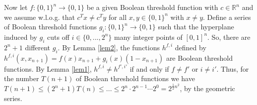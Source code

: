 \documentclass[11pt]{amsart}
\theoremstyle{definition}
\theoremstyle{definition}
\begin{document}
Now let $f \colon \{0,1 \}^n \rightarrow \{0,1 \}$ be a given Boolean threshold function with $c \in \mathbb{R}^n$ and we assume w.l.o.g. that $c^Tx \neq c^Ty$ for all $x,y \in \{0,1 \}^n$ with $x \neq y$. 
Define a series of Boolean threshold functions $g_i \colon \{0,1 \}^n \rightarrow \{0,1 \}$ such that the hyperplane induced by $g_i$ cuts off $i \in \{0,..., 2^n \}$ many integer points of $[0,1]^n$. So, there are $2^n+1$ different $g_i$. By Lemma \ref{lem2}, the functions $h^{f,i}$ defined by $h^{f,i}(x,x_{n+1}) = f(x)x_{n+1} + g_i(x)(1-x_{n+1})$ are Boolean threshold functions. By Lemma \ref{lem1}, $h^{f,i} \neq h^{f',i'}$ if and only if $f \neq f'$ or $i \neq i'$. Thus, for the number $T(n+1)$ of Boolean threshold functions we have $T(n+1) \leq (2^n+1)T(n) \leq... \leq 2^n \cdot 2^{n-1} \cdots 2^0 = 2^{\frac{1}{2}n^2}$, by the geometric series.
\end{document}
